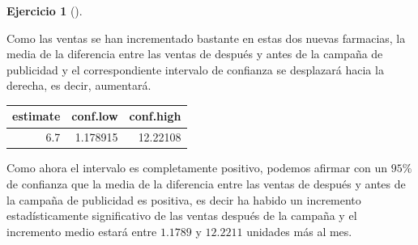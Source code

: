 \documentclass[
  a4paper,
]{scrreport}
\newenvironment{Shaded}{\begin{snugshade}}{\end{snugshade}}
\newcommand{\CommentTok}[1]{\textcolor[rgb]{0.37,0.37,0.37}{#1}}
\newcommand{\DecValTok}[1]{\textcolor[rgb]{0.68,0.00,0.00}{#1}}
\newcommand{\FunctionTok}[1]{\textcolor[rgb]{0.28,0.35,0.67}{#1}}
\newcommand{\NormalTok}[1]{\textcolor[rgb]{0.00,0.23,0.31}{#1}}
\newcommand{\OtherTok}[1]{\textcolor[rgb]{0.00,0.23,0.31}{#1}}
\newcommand{\SpecialCharTok}[1]{\textcolor[rgb]{0.37,0.37,0.37}{#1}}
\theoremstyle{definition}
\newtheorem{exercise}{Ejercicio}[chapter]
\theoremstyle{remark}
\begin{document}
\begin{exercise}[]
\begin{enumerate}
  \begin{tcolorbox}[enhanced jigsaw, coltitle=black, left=2mm, colback=white, leftrule=.75mm, toptitle=1mm, breakable, bottomrule=.15mm, titlerule=0mm, bottomtitle=1mm, title=\textcolor{quarto-callout-tip-color}{\faLightbulb}\hspace{0.5em}{Solución}, arc=.35mm, toprule=.15mm, rightrule=.15mm, colframe=quarto-callout-tip-color-frame, opacityback=0, colbacktitle=quarto-callout-tip-color!10!white, opacitybacktitle=0.6]

  Como las ventas se han incrementado bastante en estas dos nuevas
  farmacias, la media de la diferencia entre las ventas de después y
  antes de la campaña de publicidad y el correspondiente intervalo de
  confianza se desplazará hacia la derecha, es decir, aumentará.

\begin{Shaded}
\end{Shaded}

  \begin{tabular}{r|r|r}
  \hline
  estimate & conf.low & conf.high\\
  \hline
  6.7 & 1.178915 & 12.22108\\
  \hline
  \end{tabular}

  Como ahora el intervalo es completamente positivo, podemos afirmar con
  un \(95\%\) de confianza que la media de la diferencia entre las
  ventas de después y antes de la campaña de publicidad es positiva, es
  decir ha habido un incremento estadísticamente significativo de las
  ventas después de la campaña y el incremento medio estará entre
  \(1.1789\) y \(12.2211\) unidades más al mes.

  \end{tcolorbox}
\end{enumerate}

\end{exercise}
\end{document}
